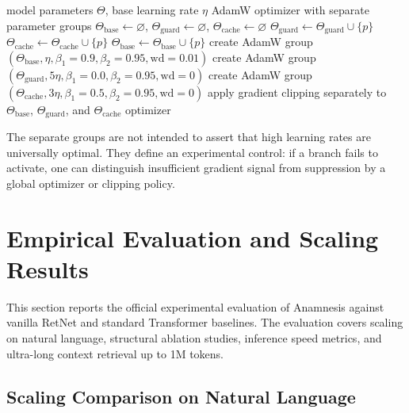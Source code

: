 \documentclass[11pt]{article}
\begin{document}
\begin{algorithm}[H]
\caption{Optimizer grouping for guarded memory branches}
\label{alg:optim}
\begin{algorithmic}[1]
\Require model parameters $\Theta$, base learning rate $\eta$
\Ensure AdamW optimizer with separate parameter groups
\State $\Theta_{\mathrm{base}}\gets\varnothing$, $\Theta_{\mathrm{guard}}\gets\varnothing$, $\Theta_{\mathrm{cache}}\gets\varnothing$
        \State $\Theta_{\mathrm{guard}}\gets\Theta_{\mathrm{guard}}\cup\{p\}$
        \State $\Theta_{\mathrm{cache}}\gets\Theta_{\mathrm{cache}}\cup\{p\}$
    \Else
        \State $\Theta_{\mathrm{base}}\gets\Theta_{\mathrm{base}}\cup\{p\}$
    \EndIf
\EndFor
\State create AdamW group $(\Theta_{\mathrm{base}},\eta,\beta_1=0.9,\beta_2=0.95,\mathrm{wd}=0.01)$
\State create AdamW group $(\Theta_{\mathrm{guard}},5\eta,\beta_1=0.0,\beta_2=0.95,\mathrm{wd}=0)$
\State create AdamW group $(\Theta_{\mathrm{cache}},3\eta,\beta_1=0.5,\beta_2=0.95,\mathrm{wd}=0)$
\State apply gradient clipping separately to $\Theta_{\mathrm{base}}$, $\Theta_{\mathrm{guard}}$, and $\Theta_{\mathrm{cache}}$
\State \Return optimizer
\end{algorithmic}
\end{algorithm}

The separate groups are not intended to assert that high learning rates are universally optimal. They define an experimental control: if a branch fails to activate, one can distinguish insufficient gradient signal from suppression by a global optimizer or clipping policy.

\section{Empirical Evaluation and Scaling Results}
\label{sec:empirical-results}

This section reports the official experimental evaluation of Anamnesis against vanilla RetNet and standard Transformer baselines. The evaluation covers scaling on natural language, structural ablation studies, inference speed metrics, and ultra-long context retrieval up to 1M tokens.

\subsection{Scaling Comparison on Natural Language}
\end{document}
